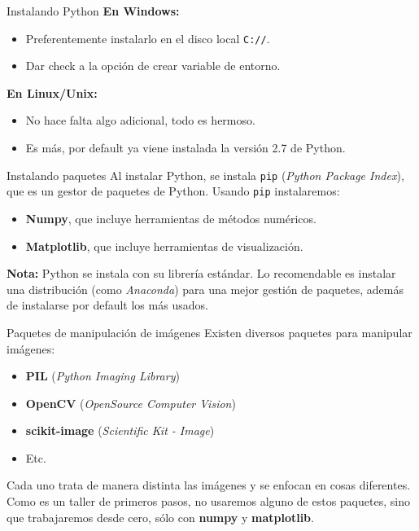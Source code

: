 \documentclass{beamer}
\begin{document}
  \begin{frame}{Instalando Python}
    \textbf{En Windows:}
    \begin{itemize}
      \item Preferentemente instalarlo en el disco local \texttt{C://}.
      \item Dar check a la opción de crear variable de entorno.
    \end{itemize}
    \textbf{En Linux/Unix:}
    \begin{itemize}
      \item No hace falta algo adicional, todo es hermoso.
      \item Es más, por default ya viene instalada la versión 2.7 de Python.
    \end{itemize}
  \end{frame}

  \begin{frame}{Instalando paquetes}
    Al instalar Python, se instala \texttt{pip} (\textit{Python Package Index}),
    que es un gestor de paquetes de Python. Usando \texttt{pip} instalaremos:
    \begin{itemize}
      \item \textbf{Numpy}, que incluye herramientas de métodos numéricos.
      \item \textbf{Matplotlib}, que incluye herramientas de visualización.
    \end{itemize}
    \textbf{Nota:} Python se instala con su librería estándar. Lo recomendable
    es instalar una distribución (como \textit{Anaconda}) para una mejor
    gestión de paquetes, además de instalarse por default los más usados.
  \end{frame}

  \begin{frame}{Paquetes de manipulación de imágenes}
    Existen diversos paquetes para manipular imágenes:
    \begin{itemize}
      \item \textbf{PIL} (\textit{Python Imaging Library})
      \item \textbf{OpenCV} (\textit{OpenSource Computer Vision})
      \item \textbf{scikit-image} (\textit{Scientific Kit - Image})
      \item Etc.
    \end{itemize}
    Cada uno trata de manera distinta las imágenes y se enfocan en cosas
    diferentes. Como es un taller de primeros pasos, no usaremos alguno de
    estos paquetes, sino que trabajaremos desde cero, sólo con \textbf{numpy}
    y \textbf{matplotlib}.
  \end{frame}
\end{document}
